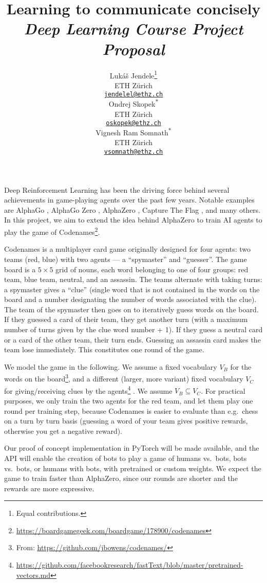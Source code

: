 \documentclass{article}
\title{Learning to communicate concisely\\{\large \textit{Deep Learning Course Project Proposal}}}
\author{
  Luk\'{a}\v{s} Jendele\thanks{Equal contributions.}\\
  ETH Z\"{u}rich\\
  \href{mailto:jendelel@ethz.ch}{\texttt{jendelel@ethz.ch}}\\
  \And
  Ondrej Skopek\textsuperscript{$\ast$}\\
  ETH Z\"{u}rich\\
  \href{mailto:oskopek@ethz.ch}{\texttt{oskopek@ethz.ch}}\\
  \And
  Vignesh Ram Somnath\textsuperscript{$\ast$}\\
  ETH Z\"{u}rich\\
  \href{mailto:vsomnath@ethz.ch}{\texttt{vsomnath@ethz.ch}}
}
\begin{document}
\maketitle

Deep Reinforcement Learning has been the driving force behind several achievements in game-playing agents over the past few years. Notable examples are AlphaGo \cite{alphago}, AlphaGo Zero \cite{alphagozero}, AlphaZero \cite{alphazero}, Capture The Flag \cite{ctf}, and many others. In this project, we aim to extend the idea behind AlphaZero to train AI agents to play the game of Codenames\footnote{\url{https://boardgamegeek.com/boardgame/178900/codenames}}.

Codenames is a multiplayer card game originally designed for four agents: two teams (red, blue) with two agents --- a ``spymaster'' and ``guesser''. The game board is a $5 \times 5$ grid of nouns, each word belonging to one of four groups: red team, blue team, neutral, and an assassin. The teams alternate with taking turns: a spymaster gives a ``clue'' (single word that is not contained in the words on the board and a number designating the number of words associated with the clue). The team of the spymaster then goes on to iteratively guess words on the board. If they guessed a card of their team, they get another turn (with a maximum number of turns given by the clue word number + 1). If they guess a neutral card or a card of the other team, their turn ends. Guessing an assassin card makes the team lose immediately. This constitutes one round of the game.

We model the game in the following. We assume a fixed vocabulary $V_B$ for the words on the board\footnote{From: \url{https://github.com/jbowens/codenames/}}, and a different (larger, more variant) fixed vocabulary $V_C$ for giving/receiving clues by the agents\footnote{\url{https://github.com/facebookresearch/fastText/blob/master/pretrained-vectors.md}} \cite{fasttext}. We assume $V_B \subseteq V_C$. For practical purposes, we only train the two agents for the red team, and let them play one round per training step, because Codenames is easier to evaluate than e.g.~chess on a turn by turn basis (guessing a word of your team gives positive rewards, otherwise you get a negative reward).

Our proof of concept implementation in PyTorch will be made available, and the API will enable the creation of bots to play a game of humans vs.~bots, bots vs.~bots, or humans with bots, with pretrained or custom weights. We expect the game to train faster than AlphaZero, since our rounds are shorter and the rewards are more expressive.
\end{document}
